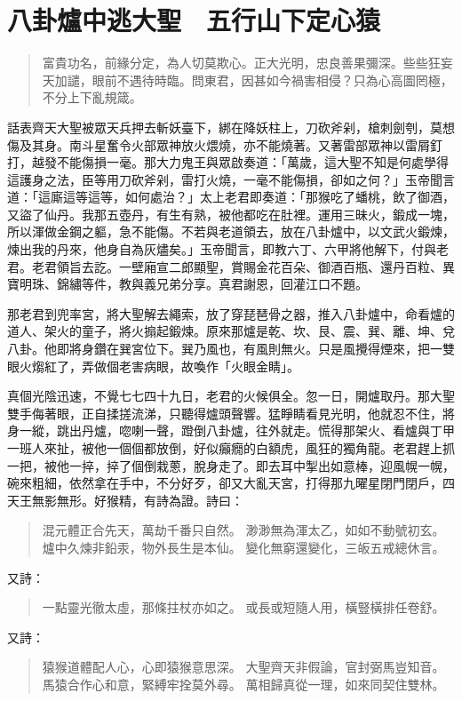 
\chapter{八卦爐中逃大聖　五行山下定心猿}

\begin{quote}
富貴功名，前緣分定，為人切莫欺心。正大光明，忠良善果彌深。些些狂妄天加譴，眼前不遇待時臨。問東君，因甚如今禍害相侵？只為心高圖罔極，不分上下亂規箴。
\end{quote}

話表齊天大聖被眾天兵押去斬妖臺下，綁在降妖柱上，刀砍斧剁，槍刺劍刳，莫想傷及其身。南斗星奮令火部眾神放火煨燒，亦不能燒著。又著雷部眾神以雷屑釘打，越發不能傷損一毫。那大力鬼王與眾啟奏道：「萬歲，這大聖不知是何處學得這護身之法，臣等用刀砍斧剁，雷打火燒，一毫不能傷損，卻如之何？」玉帝聞言道：「這廝這等這等，如何處治？」太上老君即奏道：「那猴吃了蟠桃，飲了御酒，又盜了仙丹。我那五壺丹，有生有熟，被他都吃在肚裡。運用三昧火，鍛成一塊，所以渾做金鋼之軀，急不能傷。不若與老道領去，放在八卦爐中，以文武火鍛煉，煉出我的丹來，他身自為灰燼矣。」玉帝聞言，即教六丁、六甲將他解下，付與老君。老君領旨去訖。一壁廂宣二郎顯聖，賞賜金花百朵、御酒百瓶、還丹百粒、異寶明珠、錦繡等件，教與義兄弟分享。真君謝恩，回灌江口不題。

那老君到兜率宮，將大聖解去繩索，放了穿琵琶骨之器，推入八卦爐中，命看爐的道人、架火的童子，將火搧起鍛煉。原來那爐是乾、坎、艮、震、巽、離、坤、兌八卦。他即將身鑽在巽宮位下。巽乃風也，有風則無火。只是風攪得煙來，把一雙眼火煼紅了，弄做個老害病眼，故喚作「火眼金睛」。

真個光陰迅速，不覺七七四十九日，老君的火候俱全。忽一日，開爐取丹。那大聖雙手侮著眼，正自揉搓流涕，只聽得爐頭聲響。猛睜睛看見光明，他就忍不住，將身一縱，跳出丹爐，唿喇一聲，蹬倒八卦爐，往外就走。慌得那架火、看爐與丁甲一班人來扯，被他一個個都放倒，好似癲癇的白額虎，風狂的獨角龍。老君趕上抓一把，被他一捽，捽了個倒栽蔥，脫身走了。即去耳中掣出如意棒，迎風幌一幌，碗來粗細，依然拿在手中，不分好歹，卻又大亂天宮，打得那九曜星閉門閉戶，四天王無影無形。好猴精，有詩為證。詩曰：
\begin{quote}
混元體正合先天，萬劫千番只自然。
渺渺無為渾太乙，如如不動號初玄。
爐中久煉非鉛汞，物外長生是本仙。
變化無窮還變化，三皈五戒總休言。
\end{quote}

又詩：
\begin{quote}
一點靈光徹太虛，那條拄杖亦如之。
或長或短隨人用，橫豎橫排任卷舒。
\end{quote}

又詩：
\begin{quote}
猿猴道體配人心，心即猿猴意思深。
大聖齊天非假論，官封弼馬豈知音。
馬猿合作心和意，緊縛牢拴莫外尋。
萬相歸真從一理，如來同契住雙林。
\end{quote}

